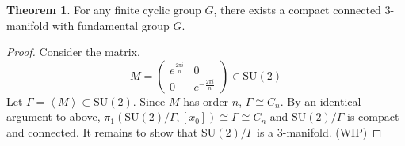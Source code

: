 \documentclass[12pt]{article}
\newcommand{\SU}[1]{\mathrm{SU}(#1)}
\theoremstyle{remark}
\theoremstyle{definition}
\newtheorem{theorem}{Theorem}[section]
\begin{document}
\begin{theorem}
For any finite cyclic group $G$, there exists a compact connected 3-manifold with fundamental group $G$.  
\end{theorem}

\begin{proof}
Consider the matrix,
\[
M = \begin{pmatrix}
e^{\frac{2 \pi i}{n}} & 0 \\
0 & e^{-\frac{2 \pi i}{n}}
\end{pmatrix} \in \SU{2}\]
Let $\Gamma = \left< M \right> \subset \SU{2}$. Since $M$ has order $n$, $\Gamma \cong C_n$. By an identical argument to above, $\pi_1(\SU{2}/\Gamma, [x_0]) \cong \Gamma \cong C_n$ and $\SU{2}/\Gamma$ is compact and connected. It remains to show that $\SU{2}/\Gamma$ is a 3-manifold. (WIP)
\end{proof}
\end{document}

